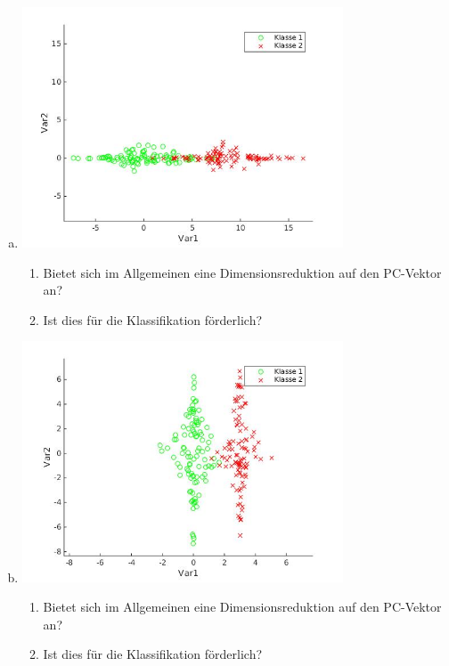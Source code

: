 \documentclass[a4paper]{scrartcl}
\begin{document}
\begin{enumerate}[(a)]
\begin{enumerate}
	\end{enumerate}
	
	\item \hfill
	
	\includegraphics[width=0.75\textwidth]{data/img3.jpg}
	
	\begin{enumerate}
		\item Bietet sich im Allgemeinen eine Dimensionsreduktion auf den PC-Vektor an?
		
		\item Ist dies für die Klassifikation förderlich?
		
	\end{enumerate}
	
	\item \hfill
	
	\includegraphics[width=0.75\textwidth]{data/img4.jpg}
	
	\begin{enumerate}
		\item Bietet sich im Allgemeinen eine Dimensionsreduktion auf den PC-Vektor an?
		
		\item Ist dies für die Klassifikation förderlich?
		
	\end{enumerate}
	
\end{enumerate}
\end{document}
